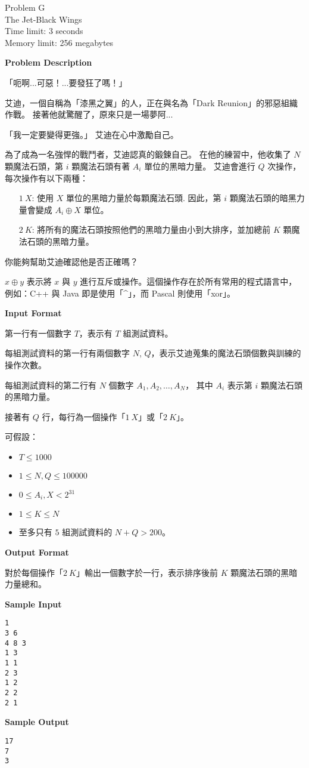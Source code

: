 \begin{center}
    {\LARGE Problem G}\vspace{1mm}\\
    {\Large The Jet-Black Wings}\\
    {Time limit: 3 seconds}\\
    {Memory limit: 256 megabytes}
\end{center}

\textbf{\large Problem Description}

「呃啊...可惡！...要發狂了嗎！」

艾迪，一個自稱為「漆黑之翼」的人，正在與名為「Dark Reunion」的邪惡組織作戰。
接著他就驚醒了，原來只是一場夢阿...

「我一定要變得更強。」 艾迪在心中激勵自己。

為了成為一名強悍的戰鬥者，艾迪認真的鍛鍊自己。
在他的練習中，他收集了 $N$ 顆魔法石頭，第 $i$ 顆魔法石頭有著 $A_i$ 單位的黑暗力量。
艾迪會進行 $Q$ 次操作，每次操作有以下兩種：

\begin{enumerate}
\item[$1\ X$:] 使用 $X$ 單位的黑暗力量於每顆魔法石頭. 因此，第 $i$ 顆魔法石頭的暗黑力量會變成
  $A_i \oplus X$ 單位。
\item[$2\ K$:] 將所有的魔法石頭按照他們的黑暗力量由小到大排序，並加總前 $K$ 顆魔法石頭的黑暗力量。
\end{enumerate}

你能夠幫助艾迪確認他是否正確嗎？

$x \oplus y$ 表示將 $x$ 與 $y$ 進行互斥或操作。這個操作存在於所有常用的程式語言中，例如：C++ 與 Java
即是使用「\^{}」，而 Pascal 則使用「xor」。

\textbf{\large Input Format}

第一行有一個數字 $T$，表示有 $T$ 組測試資料。

每組測試資料的第一行有兩個數字 $N$, $Q$，表示艾迪蒐集的魔法石頭個數與訓練的操作次數。

每組測試資料的第二行有 $N$ 個數字 $A_1, A_2, \ldots, A_N$，
其中 $A_i$ 表示第 $i$ 顆魔法石頭的黑暗力量。

接著有 $Q$ 行，每行為一個操作「$1\ X$」或「$2\ K$」。

可假設：
\begin{itemize}
    \tightlist{}
    \item $T \le 1000$
    \item $1 \le N, Q \le 100000$
    \item $0 \le A_i, X < 2^{31}$
    \item $1 \le K \le N$
    \item 至多只有 $5$ 組測試資料的 $N + Q > 200$。
\end{itemize}

\textbf{\large Output Format}

對於每個操作「$2\ K$」輸出一個數字於一行，表示排序後前 $K$ 顆魔法石頭的黑暗力量總和。

\textbf{\large Sample Input}

\begin{verbatim}
1
3 6
4 8 3
1 3
1 1
2 3
1 2
2 2
2 1
\end{verbatim}

\textbf{\large Sample Output}
\begin{verbatim}
17
7
3
\end{verbatim}


